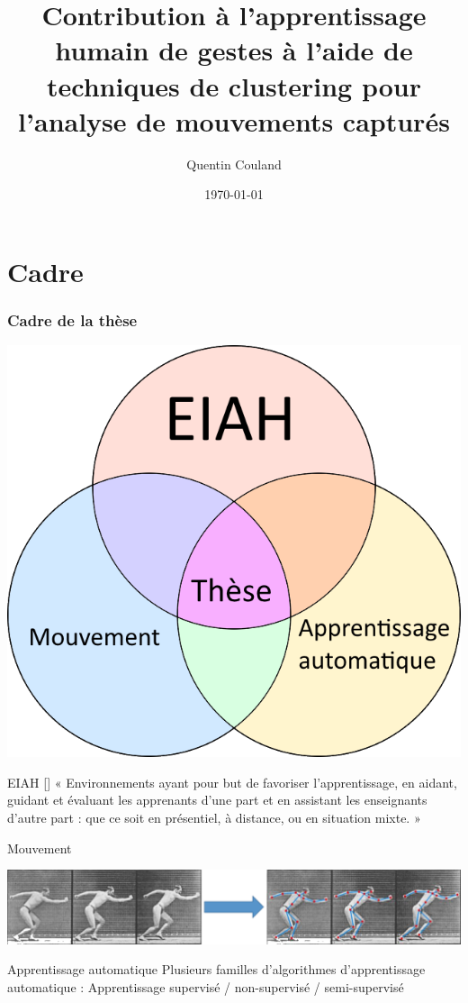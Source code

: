 \documentclass[svgnames]{beamer}
\title[]{Contribution à l'apprentissage humain de gestes à l'aide de techniques de clustering pour l’analyse de mouvements capturés}
\author{Quentin Couland}
\institute{}
\date{\today}
\newcommand{\mycite}[1]{[\textit{\cite{#1}}]}
\begin{document}
	\maketitle

	\part{Cadre}
	\section{Cadre de la thèse}
	\begin{frame}{\subsecname}
	\centering
		\includegraphics[scale=0.5]{img/venn_cadre.png}
	\end{frame}

	\begin{frame}{\secname}
	    \begin{block}{EIAH \mycite{Tchounikine2009PdR}}
	    « Environnements ayant pour but de favoriser l'apprentissage, en aidant, guidant et évaluant les apprenants d'une part et en assistant les enseignants d'autre part : que ce soit en présentiel, à distance, ou en situation mixte. »
	    \end{block}

	\begin{block}{Mouvement}
		\begin{center}
			\includegraphics[scale=0.35]{img/mouvement_cadre_2.png}
		\end{center}
	\end{block}
		
		
		\begin{block}{Apprentissage automatique}
		Plusieurs familles d'algorithmes d'apprentissage automatique : Apprentissage supervisé / non-supervisé / semi-supervisé
		\end{block}
	\end{frame}
	
\end{document}

